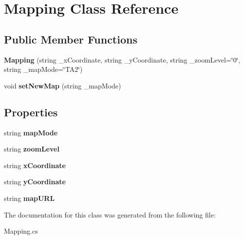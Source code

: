 \hypertarget{class_mapping}{}\section{Mapping Class Reference}
\label{class_mapping}
\subsection*{Public Member Functions}
\begin{DoxyCompactItemize}
\item 
\mbox{\label{class_mapping_a0b136ec61538a1e99eb9c267509207a4}} 
{\bfseries Mapping} (string \+\_\+x\+Coordinate, string \+\_\+y\+Coordinate, string \+\_\+zoom\+Level=\char`\"{}0\char`\"{}, string \+\_\+map\+Mode=\char`\"{}T\+A2\char`\"{})
\item 
\mbox{\label{class_mapping_a9112745f5e28c21780b47d4e74965c07}} 
void {\bfseries set\+New\+Map} (string \+\_\+map\+Mode)
\end{DoxyCompactItemize}
\subsection*{Properties}
\begin{DoxyCompactItemize}
\item 
\mbox{\label{class_mapping_a51a982480ed02f06dfdf201227ebf012}} 
string {\bfseries map\+Mode}
\item 
\mbox{\label{class_mapping_a48aa705ccb646cc6bb3915ffd62fc8eb}} 
string {\bfseries zoom\+Level}
\item 
\mbox{\label{class_mapping_afc902543b97a01af9bba71215ac36985}} 
string {\bfseries x\+Coordinate}
\item 
\mbox{\label{class_mapping_a4ea12d1c7dea2453d77a74811adcf8bc}} 
string {\bfseries y\+Coordinate}
\item 
\mbox{\label{class_mapping_ab5d51f857a9d569ffe7d9dea0830bbf6}} 
string {\bfseries map\+U\+RL}
\end{DoxyCompactItemize}


The documentation for this class was generated from the following file\+:\begin{DoxyCompactItemize}
\item 
Mapping.\+cs\end{DoxyCompactItemize}
